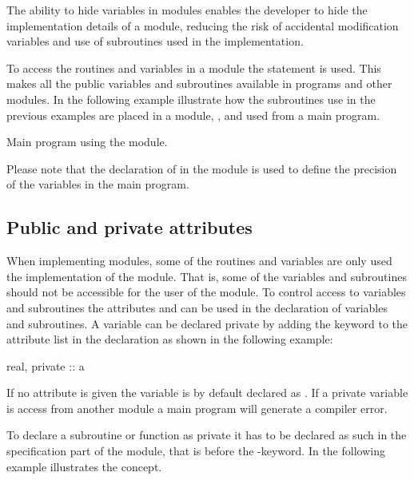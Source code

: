 The ability to hide variables in modules enables the developer to hide the implementation details of a module, reducing the risk of accidental modification variables and use of subroutines used in the implementation.

To access the routines and variables in a module the  statement is used. This makes all the public variables and subroutines available in programs and other modules. In the following example illustrate how the subroutines use in the previous examples are placed in a module, , and used from a main program.


Main program using the  module.


Please note that the declaration of  in the  module is used to define the precision of the variables in the main program.

\subsection{Public and private attributes}

When implementing modules, some of the routines and variables are only used the implementation of the module. That is, some of the variables and subroutines should not be accessible for the user of the module. To control access to variables and subroutines the attributes  and  can be used in the declaration of variables and subroutines. A variable can be declared private by adding the keyword  to the attribute list in the declaration as shown in the following example:

\begin{fortrancodeenv}
real, private :: a
\end{fortrancodeenv}

If no  attribute is given the variable is by default declared as . If a private variable is access from another module a main program will generate a compiler error.

To declare a subroutine or function as private it has to be declared as such in the specification part of the module, that is before the -keyword. In the following example illustrates the concept.


